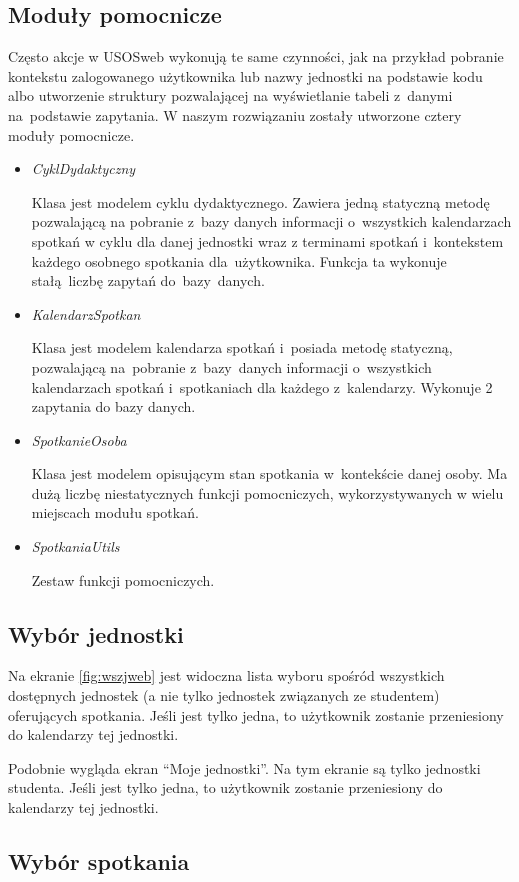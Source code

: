 \documentclass[licencjacka]{pracamgr}
\begin{document}
\subsection{Moduły pomocnicze}
Często akcje w USOSweb wykonują te same czynności, jak na przykład pobranie kontekstu zalogowanego użytkownika lub nazwy jednostki na podstawie kodu albo utworzenie struktury pozwalającej na wyświetlanie tabeli z~danymi na~podstawie zapytania.
W naszym rozwiązaniu zostały utworzone cztery moduły pomocnicze.
\begin{itemize}
\item{\textsl{CyklDydaktyczny}}

Klasa jest modelem cyklu dydaktycznego. Zawiera jedną statyczną metodę pozwalającą na pobranie z~bazy danych informacji o~wszystkich kalendarzach spotkań w cyklu dla danej jednostki wraz z terminami spotkań i~kontekstem każdego osobnego spotkania dla~użytkownika. Funkcja ta wykonuje stałą~liczbę zapytań do~bazy~danych.
\item{\textsl{KalendarzSpotkan}}

Klasa jest modelem kalendarza spotkań i~posiada metodę statyczną, pozwalającą na~pobranie z~bazy~danych informacji o~wszystkich kalendarzach spotkań i~spotkaniach dla każdego z~kalendarzy. Wykonuje 2 zapytania do bazy danych.
\item{\textsl{SpotkanieOsoba}}

Klasa jest modelem opisującym stan spotkania w~kontekście danej osoby. Ma dużą liczbę niestatycznych funkcji pomocniczych, wykorzystywanych w wielu miejscach modułu spotkań.
\item{\textsl{SpotkaniaUtils}}

Zestaw funkcji pomocniczych.
\end{itemize}

\subsection{Wybór jednostki}
Na ekranie \ref{fig:wszjweb} jest widoczna lista wyboru spośród wszystkich dostępnych jednostek (a nie tylko jednostek związanych ze studentem) oferujących spotkania. Jeśli jest tylko jedna, to użytkownik zostanie przeniesiony do kalendarzy tej jednostki. 

Podobnie wygląda ekran \enquote{Moje jednostki}. Na tym ekranie są tylko jednostki studenta. Jeśli jest tylko jedna, to użytkownik zostanie przeniesiony do kalendarzy tej jednostki.

\subsection{Wybór spotkania}
\end{document}
